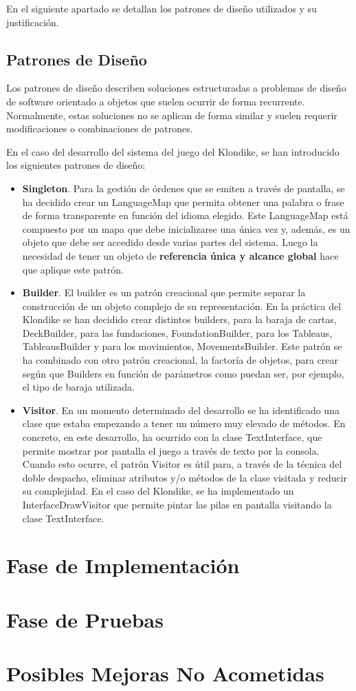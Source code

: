 \documentclass[11pt]{article}
\begin{document}
En el siguiente apartado se detallan los patrones de diseño utilizados y su justificación.

\subsection{Patrones de Diseño}

Los patrones de diseño describen soluciones estructuradas a problemas de diseño de software orientado a objetos que suelen ocurrir de forma recurrente. Normalmente, estas soluciones no se aplican de forma similar y suelen requerir modificaciones o combinaciones de patrones.

En el caso del desarrollo del sistema del juego del Klondike, se han introducido los siguientes patrones de diseño:

\begin{itemize}
\item{\textbf{Singleton}}. Para la gestión de órdenes que se emiten a través de pantalla, se ha decidido crear un LanguageMap que permita obtener una palabra o frase de forma transparente en función del idioma elegido. Este LanguageMap está compuesto por un mapa que debe inicializarse una única vez y, además, es un objeto que debe ser accedido desde varias partes del sistema. Luego la necesidad de tener un objeto de \textbf{referencia única y alcance global} hace que aplique este patrón.
\item{\textbf{Builder}}. El builder es un patrón creacional que permite separar la construcción de un objeto complejo de su representación. En la práctica del Klondike se han decidido crear distintos builders, para la baraja de cartas, DeckBuilder, para las fundaciones, FoundationBuilder, para los Tableaus, TableausBuilder y para los movimientos, MovementsBuilder. Este patrón se ha combinado con otro patrón creacional, la factoría de objetos, para crear según que Builders en función de parámetros como puedan ser, por ejemplo, el tipo de baraja utilizada.
\item{\textbf{Visitor}}. En un momento determinado del desarrollo se ha identificado una clase que estaba empezando a tener un número muy elevado de métodos. En concreto, en este desarrollo, ha ocurrido con la clase TextInterface, que permite mostrar por pantalla el juego a través de texto por la consola. Cuando esto ocurre, el patrón Visitor es útil para, a través de la técnica del doble despacho, eliminar atributos y/o métodos de la clase visitada y reducir su complejidad. En el caso del Klondike, se ha implementado un InterfaceDrawVisitor que permite pintar las pilas en pantalla visitando la clase TextInterface.
\end{itemize}

\pagebreak

\section{Fase de Implementación}

\pagebreak

\section{Fase de Pruebas}

\pagebreak

\section{Posibles Mejoras No Acometidas}

\pagebreak
\end{document}
